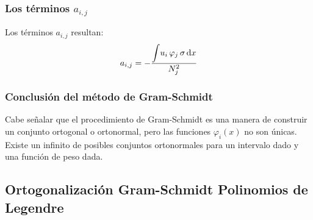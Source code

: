 \documentclass[12pt]{beamer}
\begin{document}
\begin{frame}
\frametitle{Los términos $a_{i,j}$}
Los términos $a_{i,j}$ resultan:
\pause
\begin{align}
a_{i, j} = - \dfrac{ \displaystyle \scaleint{5ex} u_{i} \, \varphi_{j} \, \sigma \dd{x}}{N_{j}^{2}}
\label{eq:ecuacion_10_49a}
\end{align}
\end{frame}
\begin{frame}
\frametitle{Conclusión del método de Gram-Schmidt}
Cabe señalar que el procedimiento de Gram-Schmidt es una manera de construir un conjunto ortogonal o ortonormal, \pause pero las funciones $\varphi_{i}(x)$ no son únicas.
\\
\bigskip
\pause
Existe un infinito de posibles conjuntos ortonormales para un intervalo dado y una función de peso dada.
\end{frame}

\subsection{Ortogonalización Gram-Schmidt Polinomios de Legendre}
\end{document}
